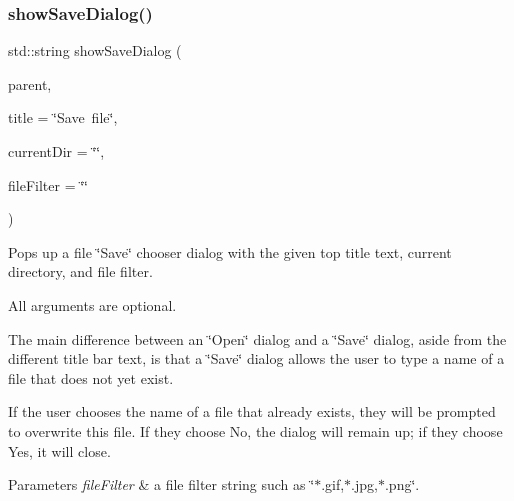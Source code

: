 \subsubsection{\texorpdfstring{show\+Save\+Dialog()}{showSaveDialog()}\hspace{0.1cm}{\footnotesize\ttfamily [2/3]}}
{\footnotesize\ttfamily std\+::string show\+Save\+Dialog (\begin{DoxyParamCaption}\item[{\mbox{\hyperlink{classGWindow}{G\+Window}} $\ast$}]{parent,  }\item[{const std\+::string \&}]{title = {\ttfamily \char`\"{}Save~file\char`\"{}},  }\item[{const std\+::string \&}]{current\+Dir = {\ttfamily \char`\"{}\char`\"{}},  }\item[{const std\+::string \&}]{file\+Filter = {\ttfamily \char`\"{}\char`\"{}} }\end{DoxyParamCaption})\hspace{0.3cm}{\ttfamily [static]}}



Pops up a file \char`\"{}\+Save\char`\"{} chooser dialog with the given top title text, current directory, and file filter. 

All arguments are optional.

The main difference between an \char`\"{}\+Open\char`\"{} dialog and a \char`\"{}\+Save\char`\"{} dialog, aside from the different title bar text, is that a \char`\"{}\+Save\char`\"{} dialog allows the user to type a name of a file that does not yet exist.

If the user chooses the name of a file that already exists, they will be prompted to overwrite this file. If they choose No, the dialog will remain up; if they choose Yes, it will close. 
\begin{DoxyParams}{Parameters}
{\em file\+Filter} & a file filter string such as \char`\"{}$\ast$.\+gif,$\ast$.\+jpg,$\ast$.\+png\char`\"{}. \\
\hline
\end{DoxyParams}
\mbox{\label{classGFileChooser_a0207a9ef46bffc79e6cebaba47c2f493}} 
